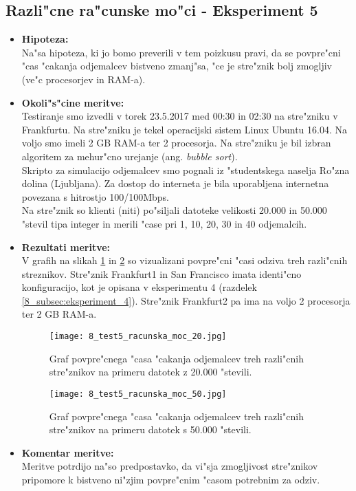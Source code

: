 \subsection{Razli"cne ra"cunske mo"ci - Eksperiment 5}
\begin{itemize}
	\item \textbf{Hipoteza: }  \\
		Na"sa hipoteza, ki jo bomo preverili v tem poizkusu pravi, da se povpre"cni "cas "cakanja odjemalcev bistveno zmanj"sa, "ce je stre"znik bolj zmogljiv (ve"c procesorjev in RAM-a).

	\item \textbf{Okoli"s"cine meritve: } \\
		Testiranje smo izvedli v torek 23.5.2017 med 00:30 in 02:30 na stre"zniku v Frankfurtu. Na stre"zniku je tekel operacijski sistem Linux Ubuntu 16.04. Na voljo smo imeli 2 GB RAM-a ter 2 procesorja. Na stre"zniku je bil izbran algoritem za mehur"cno urejanje (ang. \textit{bubble sort}).\\ Skripto za simulacijo odjemalcev smo pognali iz "studentskega naselja Ro"zna dolina (Ljubljana). Za dostop do interneta je bila uporabljena internetna povezana s hitrostjo 100/100Mbps.\\ Na stre"znik so klienti (niti) po"siljali datoteke velikosti 20.000 in 50.000 "stevil tipa integer in merili "case pri 1, 10, 20, 30 in 40 odjemalcih.

 	\item \textbf{Rezultati meritve: }  \\

		V grafih na slikah \ref{8_graf_racunska_moc_20} in \ref{8_graf_racunska_moc_50} so vizualizani povpre"cni "casi odziva treh razli"cnih streznikov. Stre"znik Frankfurt1 in San Francisco imata identi"cno konfiguracijo, kot je opisana v eksperimentu 4 (razdelek \ref{8_subsec:eksperiment_4}). Stre"znik Frankfurt2 pa ima na voljo 2 procesorja ter 2 GB RAM-a.

		\begin{figure}[h]
  		\centering
  		  \texttt{[image: 8\_test5\_racunska\_moc\_20.jpg]}
  		\caption{Graf povpre"cnega "casa "cakanja odjemalcev treh razli"cnih stre"znikov na primeru datotek z 20.000 "stevili.}
  		\label{8_graf_racunska_moc_20}
		\end{figure}

	\begin{figure}[h]
  		\centering
  		  \texttt{[image: 8\_test5\_racunska\_moc\_50.jpg]}
  		\caption{Graf povpre"cnega "casa "cakanja odjemalcev treh razli"cnih stre"znikov na primeru datotek s 50.000 "stevili.}
  		\label{8_graf_racunska_moc_50}
		\end{figure}
	\item \textbf{Komentar meritve: } \\
		Meritve potrdijo na"so predpostavko, da vi"sja zmogljivost stre"znikov pripomore k bistveno ni"zjim povpre"cnim "casom potrebnim za odziv.
\end{itemize}

